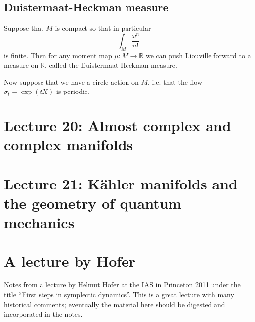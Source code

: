 \documentclass[11pt]{article} %
\begin{document}
\subsection*{Duistermaat-Heckman measure}
Suppose that $M$ is compact so that in particular 
$$
\int_M \frac{\omega^n}{n!} 
$$
is finite. Then for any moment map $\mu:M \rightarrow \mathbb{R}$ we can push Liouville forward to a measure on $\mathbb{R}$, called the Duistermaat-Heckman measure. 

Now suppose that we have a circle action on $M$, i.e. that the flow $\sigma_t = \operatorname{exp}(tX)$ is periodic. 


\section*{Lecture 20: Almost complex and complex manifolds}

\section*{Lecture 21: Kähler manifolds and the geometry of quantum mechanics}

\section*{A lecture by Hofer}

Notes from a lecture by Helmut Hofer at the IAS in Princeton 2011 under the title ``First steps in symplectic dynamics''. This is a great lecture with many historical comments; eventually the material here should be digested and incorporated in the notes. 
\end{document}

